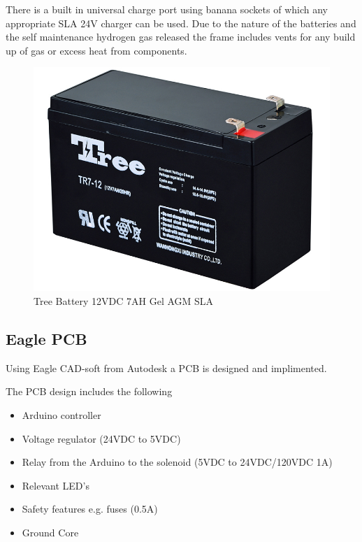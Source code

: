 \documentclass[a4paper, 10pt]{IEEEconf}
\begin{document}
There is a built in universal charge port using banana sockets of which any appropriate SLA 24V charger can be used. Due to the nature of the batteries and the self maintenance hydrogen gas released the frame includes vents for any build up of gas or excess heat from components.

\begin{figure}[H]
  \includegraphics[width=\linewidth]{images/Battery}
  \caption{Tree Battery 12VDC 7AH Gel AGM SLA}
  \label{fig:Basic stripped frame before population}
\end{figure}


\subsection{Eagle PCB}

Using Eagle CAD-soft from Autodesk \cite{eagle} a PCB is designed and implimented. 

The PCB design includes the following
\begin{itemize}
	\item Arduino controller
	\item Voltage regulator (24VDC to 5VDC)
	\item Relay from the Arduino to the solenoid (5VDC to 24VDC/120VDC 1A)
	\item Relevant LED's
	\item Safety features e.g. fuses (0.5A)
	\item Ground Core
\end{itemize}
\end{document}
